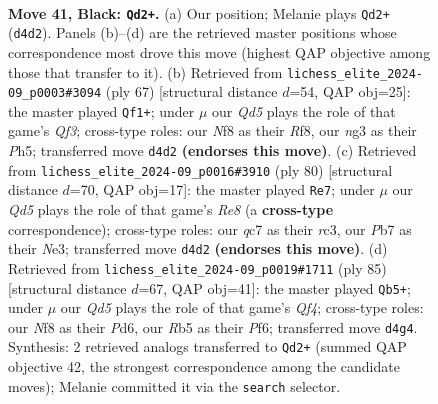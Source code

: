 \documentclass[11pt]{article}
\begin{document}
\clearpage

\begin{figure}[p]\centering
\begin{subfigure}{0.46\textwidth}\centering
\resizebox{\linewidth}{!}{%
\newchessgame
\chessboard[
  setfen={5n1k/RpQ4p/7p/1r6/3q4/6N1/6K1/7R b - - 0 41},
  showmover=false,
  pgfstyle=straightmove, color=movearrow, markmove={d4-d2}
]}
\caption{}
\end{subfigure}\hfill
\begin{subfigure}{0.46\textwidth}\centering
\resizebox{\linewidth}{!}{%
\newchessgame
\chessboard[
  setfen={5rk1/2Q2p2/2pR1q2/7p/P5b1/2N5/1P6/K7 b - - 2 34},
  showmover=false,
  pgfstyle=straightmove, color=movearrow, markmove={f6-f1}
]}
\caption{}
\end{subfigure}
\\[4pt]
\begin{subfigure}{0.46\textwidth}\centering
\resizebox{\linewidth}{!}{%
\newchessgame
\chessboard[
  setfen={4R3/5p2/8/8/2Pkn3/2r1N2P/5PK1/8 w - - 9 41},
  showmover=false,
  pgfstyle=straightmove, color=movearrow, markmove={e8-e7}
]}
\caption{}
\end{subfigure}\hfill
\begin{subfigure}{0.46\textwidth}\centering
\resizebox{\linewidth}{!}{%
\newchessgame
\chessboard[
  setfen={8/5k2/3p1p2/5qpp/8/4BN2/4K3/6R1 b - - 1 43},
  showmover=false,
  pgfstyle=straightmove, color=movearrow, markmove={f5-b5}
]}
\caption{}
\end{subfigure}
\caption{\textbf{Move 41, Black: \texttt{Qd2+}.} (a) Our position; Melanie plays \texttt{Qd2+} (\texttt{d4d2}). Panels (b)--(d) are the retrieved master positions whose correspondence most drove this move (highest QAP objective among those that transfer to it). (b) Retrieved from \texttt{lichess\_elite\_2024-09\_p0003\#3094} (ply 67) [structural distance $d$=54, QAP obj=25]: the master played \texttt{Qf1+}; under $\mu$ our \emph{Qd5} plays the role of that game's \emph{Qf3}; cross-type roles: our \emph{N}f8 as their \emph{R}f8, our \emph{n}g3 as their \emph{P}h5; transferred move \texttt{d4d2} \textbf{(endorses this move)}. (c) Retrieved from \texttt{lichess\_elite\_2024-09\_p0016\#3910} (ply 80) [structural distance $d$=70, QAP obj=17]: the master played \texttt{Re7}; under $\mu$ our \emph{Qd5} plays the role of that game's \emph{Re8} (a \textbf{cross-type} correspondence); cross-type roles: our \emph{q}c7 as their \emph{r}c3, our \emph{P}b7 as their \emph{N}e3; transferred move \texttt{d4d2} \textbf{(endorses this move)}. (d) Retrieved from \texttt{lichess\_elite\_2024-09\_p0019\#1711} (ply 85) [structural distance $d$=67, QAP obj=41]: the master played \texttt{Qb5+}; under $\mu$ our \emph{Qd5} plays the role of that game's \emph{Qf4}; cross-type roles: our \emph{N}f8 as their \emph{P}d6, our \emph{R}b5 as their \emph{P}f6; transferred move \texttt{d4g4}. Synthesis: 2 retrieved analogs transferred to \texttt{Qd2+} (summed QAP objective 42, the strongest correspondence among the candidate moves); Melanie committed it via the \texttt{search} selector.}
\label{fig:thought-m81}
\end{figure}
\end{document}

